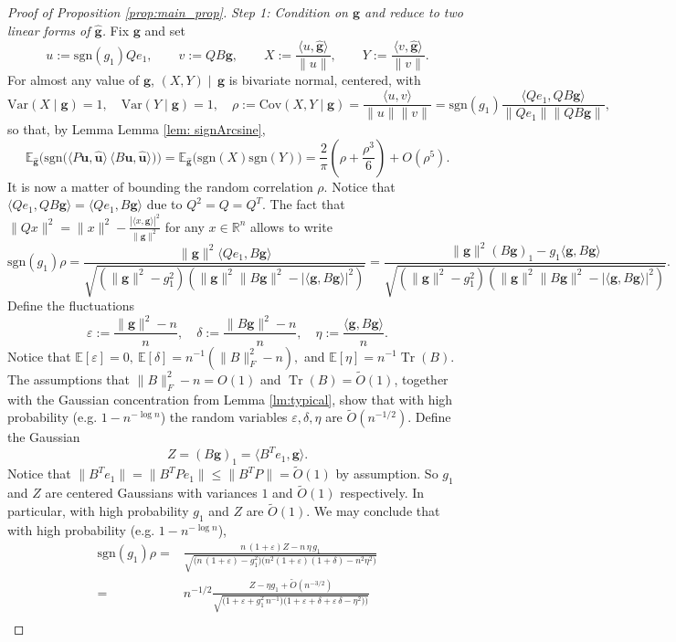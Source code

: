 \documentclass[10pt,a4paper]{amsart}
\newcommand\E{\mathbb{E}}
\newcommand\R{\mathbb{R}}
\newcommand\Tr{{\operatorname{Tr}}}
\newcommand\bg{\bm{g}}
\newcommand\bu{\bm{u}}
\newcommand\eps{\varepsilon}
\newcommand\hg{\hat{\bm g}}
\newcommand\hu{\hat{\bm u}}
\newcommand\rem{\tilde{O}\left(n^{-3/2}\right)}
\newcommand{\Cov}{\mathrm{Cov}}
\newcommand{\Var}{\mathrm{Var}}
\begin{document}
\begin{proof}[Proof of Proposition \ref{prop:main_prop}]
\emph{Step 1: Condition on $\bg$ and reduce to two linear forms of $\hg$.}
Fix $\bg$ and set
\[
u:=\mathrm{sgn}(g_1)Qe_1,\qquad v:=QB\bg, \qquad
X:=\frac{\langle u,\hg\rangle}{\|u\|},\qquad
Y:=\frac{\langle v,\hg\rangle}{\|v\|}.
\]
For almost any value of $\bg$, $(X,Y)\mid\,\bg$ is bivariate normal, centered, with
\[
\Var(X\mid \bg)=1,\quad \Var(Y\mid \bg)=1,\quad
\rho:=\Cov(X,Y\mid \bg)=\frac{\langle u,v\rangle}{\|u\|\|v\|}=\mathrm{sgn}(g_1)\frac{\langle Qe_1,QB\bg\rangle}{\|Qe_1\|\|QB\bg\|},
\]
so that, by Lemma Lemma \ref{lem: signArcsine},
\[\E_{\hg}\big(\mathrm{sgn}\!\big(\langle P\bu,\hu\rangle\,\langle B\bu,\hu\rangle\big)\big)=\E_{\hg}\big(\mathrm{sgn}(X)\mathrm{sgn}(Y)\big)=\frac{2}{\pi}\left(\rho+\frac{\rho^3}{6}\right)+O(\rho^5).\]
It is now a matter of bounding the random correlation \(\rho\). Notice that $\langle Qe_1,QB\bg\rangle=\langle Qe_1,B\bg\rangle$ due to $Q^2=Q=Q^T$. The fact that $\|Qx\|^2=\|x\|^2-\frac{|\langle x,\bg\rangle|^2}{\|\bg\|^2}$ for any $x\in\R^n$ allows to write
\[
\mathrm{sgn}(g_{1})\rho
=\frac{\|\bg\|^2\langle Qe_1,B\bg\rangle}{\sqrt{(\|\bg\|^2-g_{1}^2)(\|\bg\|^2\|B\bg\|^2-|\langle \bg,B\bg\rangle|^2)}}
=\frac{\|\bg\|^2(B\bg)_1-g_{1}\langle \bg,B\bg\rangle}{\sqrt{(\|\bg\|^2-g_{1}^2)(\|\bg\|^2\|B\bg\|^2-|\langle \bg,B\bg\rangle|^2)}}.
\]
Define the fluctuations 
\begin{equation} \label{eq:errors}
   \eps:=\frac{\|\bg\|^2-n}{n},\quad \delta:=\frac{\|B\bg\|^2-n}{n},\quad \eta:=\frac{\langle\bg,B\bg\rangle}{n}.
\end{equation}
Notice that $\E[\eps]=0,\ \E[\delta]=n^{-1}(\|B\|_{F}^2-n),$ and $\E[\eta]=n^{-1}\Tr(B)$. The assumptions that $\|B\|_{F}^2-n=O(1)$ and $\Tr(B)=\tilde{O}(1)$, together with the Gaussian concentration from Lemma \ref{lm:typical}, show that with high probability (e.g. $1-n^{-\log n}$) the random variables $\eps,\delta,\eta$ are $\tilde{O}(n^{-1/2})$. Define the Gaussian 
\[Z=(B\bg)_1=\langle B^Te_1,\bg\rangle.\]
Notice that $\|B^Te_1\|=\|B^TPe_1\|\le\|B^TP\|=\tilde{O}(1)$ by assumption. So $g_1$ and $Z$ are centered Gaussians with variances $1$ and $\tilde{O}(1)$ respectively. In particular, with high probability $g_1$ and $Z$ are $\tilde{O}(1)$. We may conclude that with high probability (e.g. $1-n^{-\log n}$),
\begin{align*}
\mathrm{sgn}(g_{1})\rho=& \frac{n\,(1+\eps)Z-n\,\eta\, g_1}{\sqrt{\big(n\,(1+\eps)-g_1^2\big)\big(n^2(1+\eps)(1+\delta)-n^2\eta^2\big)}}\\
= &    n^{-1/2}\frac{Z-\eta g_1+\rem}{\sqrt{\big(1+\eps+g_{1}^2\,n^{-1}\big)\big(1+\eps+\delta+\eps\,\delta-\eta^2)\big)}}\\

\end{align*}
\end{proof}
\end{document}
